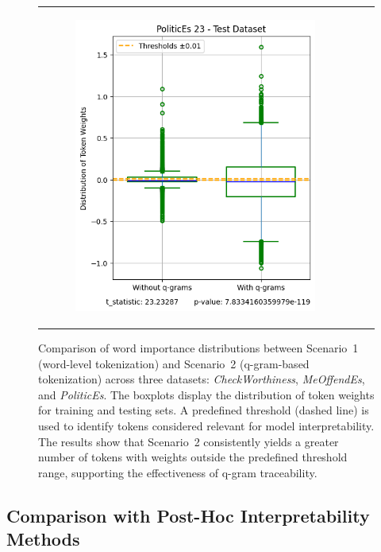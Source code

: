 \documentclass[runningheads,10pt]{llncs}
\begin{document}
\begin{figure}[t]
\begin{tabular}{c c c}
\begin{subfigure}{0.32\textwidth}
            \includegraphics[width=\linewidth]{fig_politicses_23_test.png}
            \label{fig:image6}
        \end{subfigure}
    \end{tabular}

    \caption{Comparison of word importance distributions between Scenario~1 (word-level tokenization) and Scenario~2 (q-gram-based tokenization) across three datasets: \textit{CheckWorthiness}, \textit{MeOffendEs}, and \textit{PoliticEs}. The boxplots display the distribution of token weights for training and testing sets. A predefined threshold (dashed line) is used to identify tokens considered relevant for model interpretability. The results show that Scenario~2 consistently yields a greater number of tokens with weights outside the predefined threshold range, supporting the effectiveness of q-gram traceability.}

    \label{fig:fig_bloxplots}

\end{figure}


\subsection{Comparison with Post-Hoc Interpretability Methods}
\end{document}

